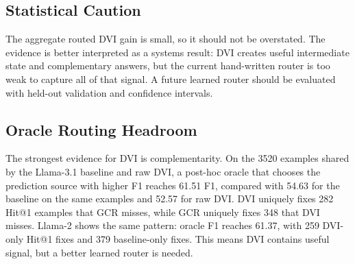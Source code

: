 \documentclass[10pt,twocolumn]{article}
\begin{document}
\subsection{Statistical Caution}
The aggregate routed DVI gain is small, so it should not be overstated. The evidence is better interpreted as a systems result: DVI creates useful intermediate state and complementary answers, but the current hand-written router is too weak to capture all of that signal. A future learned router should be evaluated with held-out validation and confidence intervals.

\subsection{Oracle Routing Headroom}
The strongest evidence for DVI is complementarity. On the 3520 examples shared by the Llama-3.1 baseline and raw DVI, a post-hoc oracle that chooses the prediction source with higher F1 reaches 61.51 F1, compared with 54.63 for the baseline on the same examples and 52.57 for raw DVI. DVI uniquely fixes 282 Hit@1 examples that GCR misses, while GCR uniquely fixes 348 that DVI misses. Llama-2 shows the same pattern: oracle F1 reaches 61.37, with 259 DVI-only Hit@1 fixes and 379 baseline-only fixes. This means DVI contains useful signal, but a better learned router is needed.

\begin{table}[H]
\centering
\small
{}
\caption{Post-hoc oracle routing over shared GCR/DVI examples. This is an upper bound, not a deployable method.}
\label{tab:oracle}
\end{table}
\end{document}
